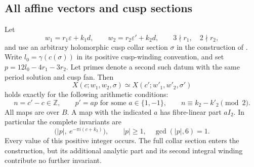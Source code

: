 \subsection{All affine vectors and cusp sections}
\begin{proposition}[FAM B.2.1; T]\label{fam:B.2.1}
Let
\[
 w_1=r_1\varepsilon+k_1d,\qquad w_2=r_2\varepsilon'+k_2d,
 \qquad 3\nmid r_1,\quad 2\nmid r_2,
\]
and use an arbitrary holomorphic cusp collar section $\sigma$ in the construction of \cite[Section 6.4]{AC26}. Write $l_0=\gamma(c(\sigma))$ in its positive cusp-winding convention, and set $p=12l_0-4r_1-3r_2$. Let primes denote a second such datum with the same period solution and cusp fan. Then
\[
 X(c;w_1,w_2,\sigma)\simeq X(c';w'_1,w'_2,\sigma')
\]
holds exactly for the following arithmetic conditions:
\[
 n=c'-c\in\mathbb Z,\qquad
 p'=a p\text{ for some }a\in\{1,-1\},\qquad
 n\equiv k_2-k'_2\pmod2.
\]
All maps are over $B$. A map with the indicated $a$ has fibre-linear part $aI_2$. In particular the complete invariants are
\[
 \bigl(|p|,\ e^{-\pi i(c+k_2)}\bigr),\qquad
 |p|\ge1,\quad\gcd(|p|,6)=1.
\]
Every value of this positive integer occurs. The full collar section enters the construction, but its additional analytic part and its second integral winding contribute no further invariant.
\end{proposition}
